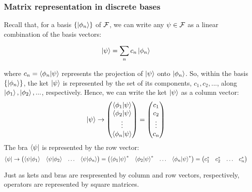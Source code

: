 \subsubsection{Matrix representation in discrete bases}

Recall that, for a basis $\{\ket{\phi_n}\}$ of $\mathcal{F}$, we can write any $\psi\in\mathcal{F}$ as a linear combination of the basis vectors:

\begin{equation}
    \ket{\psi} = \sum_n c_n\ket{\phi_n}
\end{equation}

where $c_n = \braket{\phi_n|\psi}$ represents the projection of $\ket{\psi}$ onto $\ket{\phi_n}$. So, within the basis $\{\ket{\phi_n}\}$, the ket $\ket{\psi}$ is represented by the set of its components, $c_1, c_2, ...$, along $\ket{\phi_1}, \ket{\phi_2}, ...$, respectively. Hence, we can write the ket $\ket{\psi}$ as a column vector:
\begin{equation}
    \ket{\psi} \to \begin{pmatrix}
        \braket{\phi_1|\psi} \\ \braket{\phi_2|\psi} \\ \vdots \\ \braket{\phi_n|\psi}
    \end{pmatrix} = \begin{pmatrix}
        c_1 \\ c_2 \\ \vdots \\ c_n
    \end{pmatrix}
\end{equation}
The bra $\bra{\psi}$ is represented by the row vector:
\begin{equation}
    \bra{\psi} \to \begin{pmatrix}
        \braket{\psi|\phi_1} & \braket{\psi|\phi_2} & \hdots & \braket{\psi|\phi_n}
    \end{pmatrix} = \begin{pmatrix}
        \braket{\phi_1|\psi}^* & \braket{\phi_2|\psi}^* & \hdots & \braket{\phi_n|\psi}^* 
    \end{pmatrix} =
    \begin{pmatrix}
        c_1^* & c_2^* & \hdots & c_n^*
    \end{pmatrix}
\end{equation}

Just as kets and bras are respresented by column and row vectors, respectively, operators are represented by square matrices.

